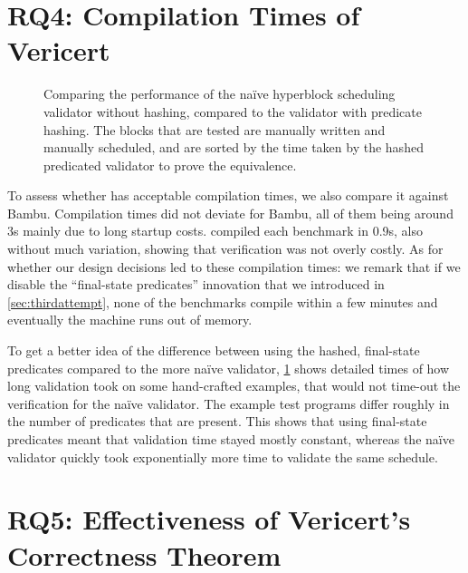 \section{RQ4: Compilation Times of Vericert}

\begin{figure}
  \centering
  \resizebox{\linewidth}{!}{}
  \caption{Comparing the performance of the na\"ive hyperblock scheduling
    validator without hashing, compared to the validator with predicate hashing.
    The blocks that are tested are manually written and manually scheduled, and
    are sorted by the time taken by the hashed predicated validator to prove the
    equivalence.}%
  \label{fig:eval:comparison-hashing}
\end{figure}

To assess whether \VericertHyper{} has acceptable compilation times, we also
compare it against Bambu.  Compilation times did not deviate for Bambu, all of
them being around 3s mainly due to long startup costs. \VericertHyper{} compiled
each benchmark in 0.9s, also without much variation, showing that verification
was not overly costly.  As for whether our design decisions led to these
compilation times: we remark that if we disable the \enquote{final-state
  predicates} innovation that we introduced in \cref{sec:thirdattempt}, none of
the benchmarks compile within a few minutes and eventually the machine runs out
of memory.

To get a better idea of the difference between using the hashed, final-state
predicates compared to the more naïve validator,
\cref{fig:eval:comparison-hashing} shows detailed times of how long validation
took on some hand-crafted examples, that would not time-out the verification for
the naïve validator.  The example test programs differ roughly in the number of
predicates that are present.  This shows that using final-state predicates meant
that validation time stayed mostly constant, whereas the naïve validator quickly
took exponentially more time to validate the same schedule.

\section{RQ5: Effectiveness of Vericert's Correctness Theorem}

